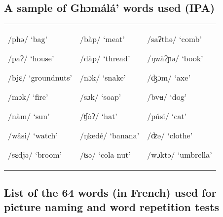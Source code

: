 \documentclass[output=paper,newtxmath,modfonts,nonflat,draftmode]{langsci/langscibook}
\begin{document}
\subsection*{A sample of Ghɔmálá’ words used (IPA)}

\begin{tabularx}{\textwidth}{@{}XXX@{}}
/phə/ ‘bag’

/paʔ/ ‘house’

/bjɛ/ ‘groundnuts’

/mɔk/ ‘fire’

/nàm/ ‘sun’

/wâsi/ ‘watch’

/sɛdjə/ ‘broom’ & /bàp/ ‘meat’

/dàp/ ‘thread’

/nɔk/ ‘snake’

/sɔk/ ‘soap’

/ʧòʔ/ ‘hat’

/ŋkedé/ ‘banana’

/ʦə/ ‘cola nut’ & /saʔthə/   ‘comb’

/ŋwàʔɲə/ ‘book’

/ʤɔm/ ‘axe’

/bvʉ/ ‘dog’

/púsi/ ‘cat’

/ʣə/ ‘clothe’

/wɔktə/ ‘umbrella’\\
\end{tabularx}
\clearpage

\subsection*{List of the 64 words (in French) used for picture naming and word repetition tests}
\end{document}
